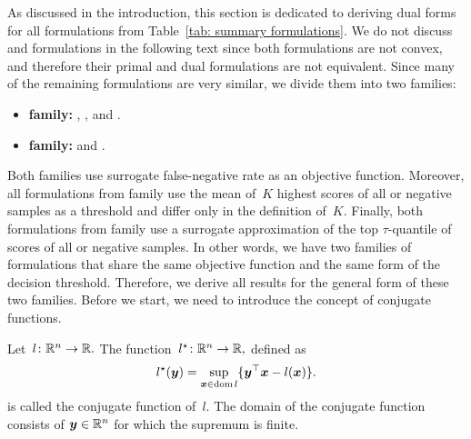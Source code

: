 As discussed in the introduction, this section is dedicated to deriving dual forms for all formulations from Table~\ref{tab: summary formulations}. We do not discuss \Grill and \GrillNP formulations in the following text since both formulations are not convex, and therefore their primal and dual formulations are not equivalent. Since many of the remaining formulations are very similar, we divide them into two families:
\begin{itemize}
  \item \textbf{\TopPushK family:} \TopPush, \TopPushK, \TopMeanK and \tauFPL.
  \item \textbf{\PatMat family:} \PatMat and \PatMatNP.
\end{itemize}
Both families use surrogate false-negative rate as an objective function. Moreover, all formulations from \TopPushK family use the mean of~$K$ highest scores of all or negative samples as a threshold and differ only in the definition of~$K.$ Finally, both formulations from \PatMat family use a surrogate approximation of the top $\tau$-quantile of scores of all or negative samples. In other words, we have two families of formulations that share the same objective function and the same form of the decision threshold. Therefore, we derive all results for the general form of these two families. Before we start, we need to introduce the concept of conjugate functions.

\pagebreak

\begin{definition}\label{def: conjugate}
  Let~$l \colon \mathbb{R}^n \to \mathbb{R}.$ The function~$l^{\star} \colon \mathbb{R}^n \to \mathbb{R},$ defined as
  \begin{equation*}
    l^{\star} (\bm{y})
      =  \sup_{\bm{x} \in \operatorname*{dom} l} \{\bm{y}^{\top}\bm{x} - l(\bm{x})\}.
  \end{equation*}
  is called the conjugate function of~$l.$ The domain of the conjugate function
  consists of $\bm{y} \in \mathbb{R}^n$ for which the supremum is finite. 
\end{definition}

